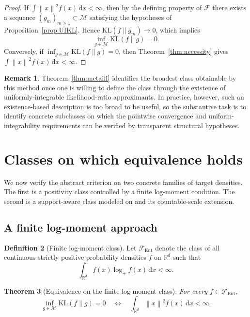 \documentclass[11pt]{article}
\newtheorem{theorem}{Theorem}[section]
\theoremstyle{definition}
\newtheorem{definition}[theorem]{Definition}
\newtheorem{remark}[theorem]{Remark}
\begin{document}
\begin{proof}
If $\int \left\lVert x \right\rVert^2 f(x)\,\mathrm{d}x<\infty$, then by the defining property of $\mathcal F$ there exists a sequence $(g_m)_{m\ge1}\subset\mathcal M$ satisfying the hypotheses of Proposition~\ref{prop:UIKL}. Hence $\mathrm{KL}(f\|g_m)\to0$, which implies
\[
\inf_{g\in\mathcal M}\mathrm{KL}(f\|g)=0.
\]
Conversely, if $\inf_{g\in\mathcal M}\mathrm{KL}(f\|g)=0$, then Theorem~\ref{thm:necessity} gives $\int \left\lVert x \right\rVert^2 f(x)\,\mathrm{d}x<\infty$.
\end{proof}

\begin{remark}
Theorem~\ref{thm:metaiff} identifies the broadest class obtainable by this method once one is willing to define the class through the existence of uniformly-integrable likelihood-ratio approximants. In practice, however, such an existence-based description is too broad to be useful, so the substantive task is to identify concrete subclasses on which the pointwise convergence and uniform-integrability requirements can be verified by transparent structural hypotheses.
\end{remark}

\section{Classes on which equivalence holds}\label{sec:classes}

We now verify the abstract criterion on two concrete families of target densities. The first is a positivity class controlled by a finite log-moment condition. The second is a support-aware class modeled on \citet{NoretsPelenis2012} and its countable-scale extension.

\subsection{A finite log-moment approach}

\begin{definition}[Finite log-moment class]
\label{def:Fent}
Let $\mathcal F_{\mathrm{Ent}}$ denote the class of all continuous strictly positive probability densities $f$ on $\mathbb{R}^d$ such that
\[
\int_{\mathbb{R}^d} f(x)\log_+ f(x)\,\mathrm{d}x<\infty.
\]
\end{definition}

\begin{theorem}[Equivalence on the finite log-moment class]
\label{thm:entclass-UI}
For every $f\in\mathcal F_{\mathrm{Ent}}$,
\[
\inf_{g\in\mathcal M}\mathrm{KL}(f\|g)=0
\quad\Longleftrightarrow\quad
\int_{\mathbb{R}^d}\left\lVert x \right\rVert^2f(x)\,\mathrm{d}x<\infty.
\]
\end{theorem}
\end{document}
